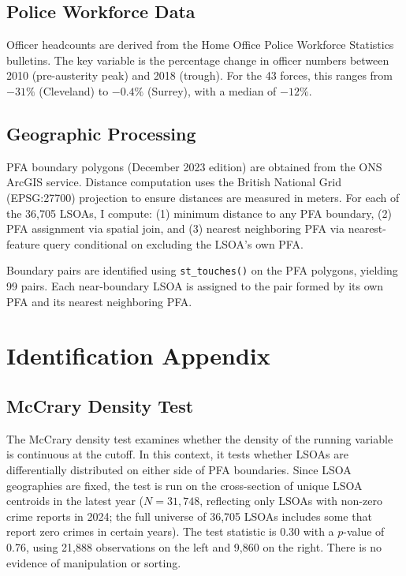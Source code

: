 \documentclass[12pt]{article}
\begin{document}
\subsection{Police Workforce Data}

Officer headcounts are derived from the Home Office Police Workforce Statistics bulletins. The key variable is the percentage change in officer numbers between 2010 (pre-austerity peak) and 2018 (trough). For the 43 forces, this ranges from $-31\%$ (Cleveland) to $-0.4\%$ (Surrey), with a median of $-12\%$.

\subsection{Geographic Processing}

PFA boundary polygons (December 2023 edition) are obtained from the ONS ArcGIS service. Distance computation uses the British National Grid (EPSG:27700) projection to ensure distances are measured in meters. For each of the 36,705 LSOAs, I compute: (1) minimum distance to any PFA boundary, (2) PFA assignment via spatial join, and (3) nearest neighboring PFA via nearest-feature query conditional on excluding the LSOA's own PFA.

Boundary pairs are identified using \texttt{st\_touches()} on the PFA polygons, yielding 99 pairs. Each near-boundary LSOA is assigned to the pair formed by its own PFA and its nearest neighboring PFA.


\section{Identification Appendix}

\subsection{McCrary Density Test}

The McCrary density test \citep{mccrary2008} examines whether the density of the running variable is continuous at the cutoff. In this context, it tests whether LSOAs are differentially distributed on either side of PFA boundaries. Since LSOA geographies are fixed, the test is run on the cross-section of unique LSOA centroids in the latest year ($N = 31{,}748$, reflecting only LSOAs with non-zero crime reports in 2024; the full universe of 36,705 LSOAs includes some that report zero crimes in certain years). The test statistic is 0.30 with a $p$-value of 0.76, using 21,888 observations on the left and 9,860 on the right. There is no evidence of manipulation or sorting.
\end{document}
